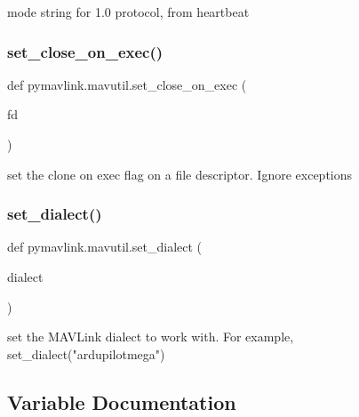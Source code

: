 \begin{DoxyVerb}mode string for 1.0 protocol, from heartbeat\end{DoxyVerb}
 \mbox{\label{namespacepymavlink_1_1mavutil_ac57a06b1fcc6d1aebdf19e127291fedd}} 
\subsubsection{\texorpdfstring{set\+\_\+close\+\_\+on\+\_\+exec()}{set\_close\_on\_exec()}}
{\footnotesize\ttfamily def pymavlink.\+mavutil.\+set\+\_\+close\+\_\+on\+\_\+exec (\begin{DoxyParamCaption}\item[{}]{fd }\end{DoxyParamCaption})}

\begin{DoxyVerb}set the clone on exec flag on a file descriptor. Ignore exceptions\end{DoxyVerb}
 \mbox{\label{namespacepymavlink_1_1mavutil_a00783411dfe2e390ef6fe4427a7a1b76}} 
\subsubsection{\texorpdfstring{set\+\_\+dialect()}{set\_dialect()}}
{\footnotesize\ttfamily def pymavlink.\+mavutil.\+set\+\_\+dialect (\begin{DoxyParamCaption}\item[{}]{dialect }\end{DoxyParamCaption})}

\begin{DoxyVerb}set the MAVLink dialect to work with.
For example, set_dialect("ardupilotmega")
\end{DoxyVerb}
 

\subsection{Variable Documentation}
\mbox{\label{namespacepymavlink_1_1mavutil_ac9d749bf27ffcda89f1df443284c2ff5}} 
